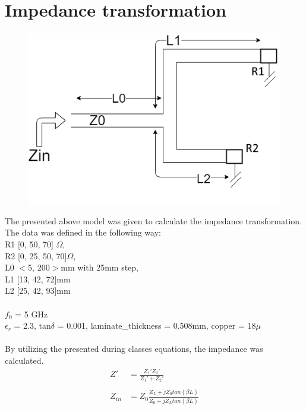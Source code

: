 \documentclass[a4paper, 11pt]{report}
\begin{document}
\section{Impedance transformation}
\begin{figure}[h]
	\centering
	\includegraphics[width=0.7\linewidth]{impedance}
	\label{fig:impedance}
\end{figure}
\noindent
The presented above model was given to calculate the impedance transformation.
The data was defined in the following way:\\
R1 [0, 50, 70] $\Omega$,\\
R2 [0, 25, 50, 70]$\Omega$,\\
L0 $<$5, 200$>$mm with 25mm step,\\
L1 [13, 42, 72]mm\\
L2 [25, 42, 93]mm\\
\\
$f_0$ = 5 GHz\\
$\epsilon _r$ = 2.3,  tan$\delta$ = 0.001, laminate\_thickness = 0.508mm, copper = 18$\mu$
\\
\\
By utilizing the presented during classes equations, the impedance was calculated.\\
\begin{align*}
Z' &= \frac{Z_1 ' Z_2 '}{Z_1 ' + Z_2 '}\\
\\
Z_{in} &= Z_0 \frac{Z_L + jZ_0tan(\beta L)}{Z_0 + jZ_Ltan(\beta L)}
\end{align*}
\end{document}
